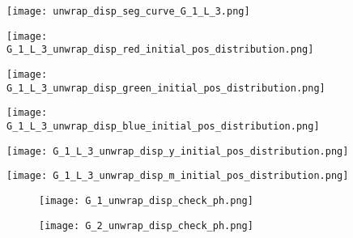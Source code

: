       \begin{figure}
         \centering
         \texttt{[image: unwrap\_disp\_seg\_curve\_G\_1\_L\_3.png]}
         \caption{}
         \label{fig:disp_seg_curve_G_1_L_3}
      \end{figure}

      
       \begin{figure}
         \centering
         \texttt{[image: G\_1\_L\_3\_unwrap\_disp\_red\_initial\_pos\_distribution.png]}
         \caption{}
         \label{fig:G_1_L_3_disp_red_initial_pos_distribution}
       \end{figure}


       \begin{figure}
         \centering
         \texttt{[image: G\_1\_L\_3\_unwrap\_disp\_green\_initial\_pos\_distribution.png]}
         \caption{}
         \label{fig:G_1_L_3_disp_green_initial_pos_distribution}
       \end{figure}


        \begin{figure}
         \centering
         \texttt{[image: G\_1\_L\_3\_unwrap\_disp\_blue\_initial\_pos\_distribution.png]}
         \caption{}
         \label{fig:G_1_L_3_disp_blue_initial_pos_distribution}
        \end{figure}


        \begin{figure}
         \centering
         \texttt{[image: G\_1\_L\_3\_unwrap\_disp\_y\_initial\_pos\_distribution.png]}
         \caption{}
         \label{fig:G_1_L_3_disp_yellow_initial_pos_distribution}
        \end{figure}



        \begin{figure}
         \centering
         \texttt{[image: G\_1\_L\_3\_unwrap\_disp\_m\_initial\_pos\_distribution.png]}
         \caption{}
         \label{fig:G_1_L_3_disp_pink_initial_pos_distribution}
        \end{figure}


        

        \begin{figure}
        \centering
        \begin{subfigure}[b]{0.45\textwidth}
          \texttt{[image: G\_1\_unwrap\_disp\_check\_ph.png]}
          \caption{}
          \label{fig:g1_disp_check_ph}
        \end{subfigure}
        \hfill
        \begin{subfigure}[b]{0.45\textwidth}
          \texttt{[image: G\_2\_unwrap\_disp\_check\_ph.png]}
          \caption{}
          \label{fig:g1_disp_check_ph}
        \end{subfigure}
        \caption{}
        \label{fig:branch_disp_check_ph}
      \end{figure}


